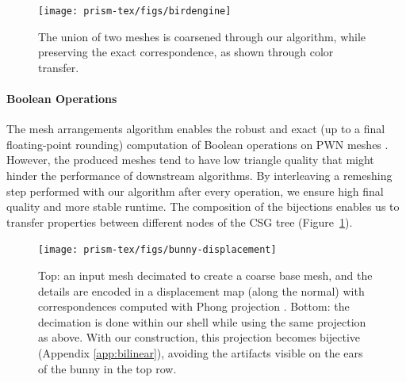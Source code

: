 

\begin{figure}
    \centering
    \texttt{[image: prism-tex/figs/birdengine]}
    \caption{The union of two meshes is coarsened through our algorithm, while preserving the exact correspondence, as shown through color transfer.}
    \label{prism:fig:birdengine}
    
\end{figure}

\paragraph{Boolean Operations}
The mesh arrangements algorithm enables the robust and exact (up to a final floating-point rounding) computation of Boolean operations on PWN meshes \cite{zhou2016mesh}. 
However, the produced meshes tend to have low triangle quality that might hinder the performance of {downstream} algorithms. %
By interleaving a remeshing step performed with our algorithm after every operation, we ensure  high final quality and more stable runtime. The composition of the bijections enables us to transfer properties between different nodes of the CSG tree (Figure~\ref{prism:fig:birdengine}).%


\begin{figure}
    \centering
    \texttt{[image: prism-tex/figs/bunny-displacement]}
    \caption{Top: an input mesh decimated to create a coarse base mesh, and the details are encoded in a displacement map (along the normal) with correspondences computed with Phong projection \cite{kobbelt1998interactive}. Bottom: the decimation is done within our shell while using the same projection as above. With our construction, this projection becomes bijective (Appendix \ref{app:bilinear}), avoiding the artifacts visible on the ears of  the bunny in the top row.}
    \label{prism:fig:displacement-mapping}
    
\end{figure}
